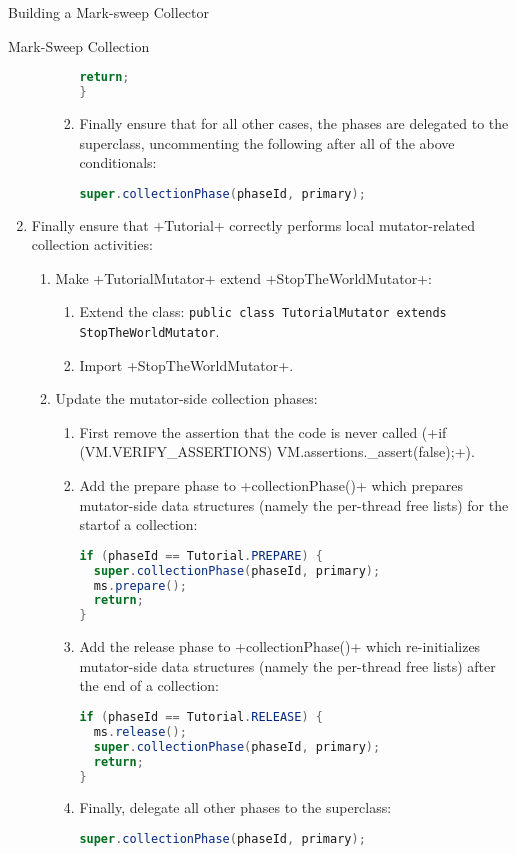 \begin{chapter}{Building a Mark-sweep Collector}
\begin{section}{Mark-Sweep Collection}
\begin{enumerate}
\begin{enumerate}
\begin{enumerate}
\begin{lstlisting}[language=Java]
  return;
}
             \end{lstlisting}
           \item Finally ensure that for all other cases, the phases are delegated to the superclass, uncommenting the following after all of the above conditionals:
             \begin{lstlisting}[language=Java]
super.collectionPhase(phaseId, primary);
             \end{lstlisting}
         \end{enumerate}
    \end{enumerate} 
  \item Finally ensure that \spverb+Tutorial+ correctly performs local mutator-related collection activities:
    \begin{enumerate}
      \item Make \spverb+TutorialMutator+ extend \spverb+StopTheWorldMutator+:
        \begin{enumerate}
          \item Extend the class: \texttt{pu\-blic class Tu\-to\-rial\-Mu\-ta\-tor ex\-tends Stop\-The\-World\-Mu\-ta\-tor}.
          \item Import \spverb+StopTheWorldMutator+.
        \end{enumerate}
      \item Update the mutator-side collection phases:
        \begin{enumerate}
          \item First remove the assertion that the code is never called (\spverb+if (VM.VERIFY_ASSERTIONS) VM.assertions._assert(false);+).
          \item Add the prepare phase to \spverb+collectionPhase()+ which prepares mutator-side data structures (namely the per-thread free lists) for the startof a collection:
            \begin{lstlisting}[language=Java]
if (phaseId == Tutorial.PREPARE) {
  super.collectionPhase(phaseId, primary);
  ms.prepare();
  return;
}
            \end{lstlisting}
          \item Add the release phase to \spverb+collectionPhase()+ which re-initializes mutator-side data structures (namely the per-thread free lists) after the end of a collection:
            \begin{lstlisting}[language=Java]
if (phaseId == Tutorial.RELEASE) {
  ms.release();
  super.collectionPhase(phaseId, primary);
  return;
}
            \end{lstlisting}
          \item Finally, delegate all other phases to the superclass:
            \begin{lstlisting}[language=Java]
super.collectionPhase(phaseId, primary);
            \end{lstlisting}
        \end{enumerate}
    \end{enumerate}
\end{enumerate}


\end{section}
\end{chapter}

